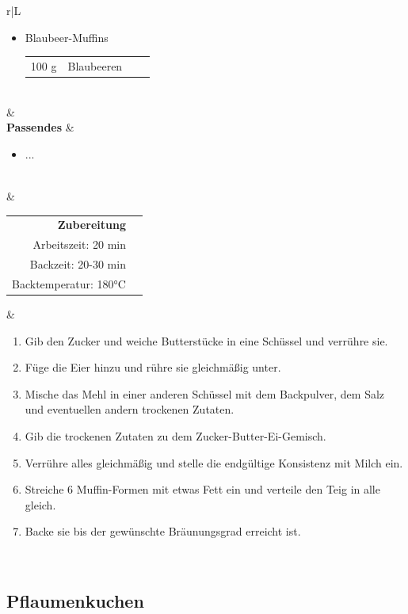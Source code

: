 \documentclass[a4paper, 12pt]{scrbook} 								%
\numberwithin{equation}{section} 									%
\begin{document}
\begin{tabularx}{\textwidth}{r|L}
\begin{itemize}[nosep]
											\item Blaubeer-Muffins
												\begin{tabular}{llll}
													100 g & Blaubeeren \\
												\end{tabular}
										\end{itemize} \\
									&	\\	
			\textbf{Passendes}		&	\begin{itemize}[nosep]
											\item ...
										\end{itemize}	\\
									&	\\	
			\begin{tabular}[t]{rr}
				\textbf{Zubereitung}	\\
				Arbeitszeit: 20 min	\\
				Backzeit: 20-30 min		\\
				Backtemperatur: 180°C \\
			\end{tabular}			&	\begin{enumerate}[nosep]
											\item Gib den Zucker und weiche Butterstücke in eine Schüssel und verrühre sie.
											\item Füge die Eier hinzu und rühre sie gleichmäßig unter.
											\item Mische das Mehl in einer anderen Schüssel mit dem Backpulver, dem Salz und eventuellen andern trockenen Zutaten.
											\item Gib die trockenen Zutaten zu dem Zucker-Butter-Ei-Gemisch.
											\item Verrühre alles gleichmäßig und stelle die endgültige Konsistenz mit Milch ein.
											\item Streiche 6 Muffin-Formen mit etwas Fett ein und verteile den Teig in alle gleich.
											\item Backe sie bis der gewünschte Bräunungsgrad erreicht ist.
										\end{enumerate}	\\
		\end{tabularx}
		\newpage



		\subsection{Pflaumenkuchen}	\label{pflaumenkuchen}
\end{document}
